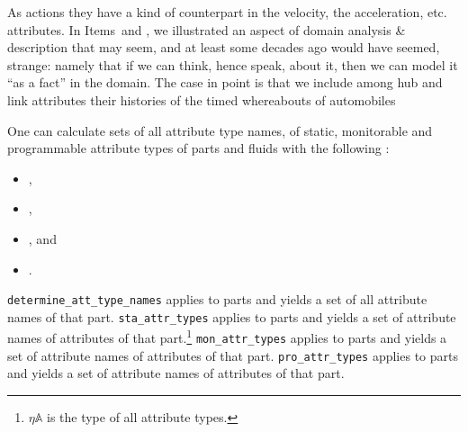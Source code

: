 {\pind As actions they have a kind of counterpart in the
      \textsf{vel}ocity, the \textsf{acc}eleration, etc. attributes.
\afslut
\afslut
\pos{\emcii}{}
\mnewfoil\smallish\HHHH
\begynd
\pind In Items\, and , 
      we illustrated an aspect of domain 
      analysis \& description that may seem, and at least some decades
      ago would have seemed, strange: namely that if we can think,
      hence speak, about it, then we can model it ``as a fact'' in the
      domain. The case in point is that we include among hub and link
      attributes their histories of the timed whereabouts of \ysf{ }
      automobiles\footnotemark\dbsquare
\afslut
} 
\pos{\psno}{\mnewfoil}

\label{Calculating Attribute Category Types}


\begynd
\pind One can calculate sets of all attribute type names, of static,
      \ysf{} monitorable and programmable attribute types of parts and
      fluids with the following :
\begin{itemize}
\item {},
\item {},
\item {}, and
\item {}.
\end{itemize}
\noindent
\begynd
\pind \texttt{determine\_att\_type\_names} applies to parts and
      yields a set of all attribute names of that part.
\pind \texttt{sta\_attr\_types} applies to parts and
      yields a set of attribute names of  attributes
      of that part.\footnote{\LLLL $\eta\mathbb{A}$ is the type of all
      attribute types.}
\pind \texttt{mon\_attr\_types} applies to parts and
      yields a set of attribute names of  attributes
      of that part.
\pind \texttt{pro\_attr\_types} applies to parts and
      yields a set of attribute names of  attributes
      of that part.
\afslut
\afslut
\mnewfoil
{}

